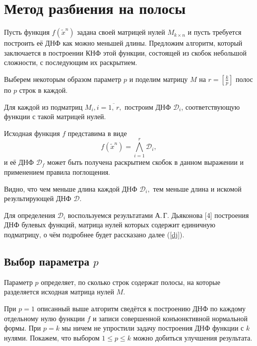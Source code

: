 \documentclass[12pt,a4paper,oneside,fleqn,leqno]{article}
\theoremstyle{definition}
\begin{document}
	\section{Метод разбиения на полосы}
		Пусть функция $f(\tilde x^n)$ задана своей матрицей нулей $M_{k \times n}$ и пусть требуется построить её ДНФ как можно меньшей длины. Предложим алгоритм, который заключается в построении КНФ этой функции, состоящей из скобок небольшой сложности, с последующим их раскрытием.\par
		Выберем некоторым образом параметр $p$ и поделим матрицу $M$ на $r = \left[\frac{k}{p}\right]$ полос по $p$ строк в каждой.\par
		Для каждой из подматриц $M_i, i = \overline{1,\,r},$ построим ДНФ $\mathcal{D}_i$, соответствующую функции с такой матрицей нулей.\par
		Исходная функция $f$ представима в виде
		$$
			f(\tilde x^n) = \bigwedge_{i = 1}^r \mathcal{D}_i,
		$$
		и её ДНФ $\mathcal{D}_f$ может быть получена раскрытием скобок в данном выражении и применением правила поглощения.\par
		Видно, что чем меньше длина каждой ДНФ $\mathcal{D}_i,$ тем меньше длина и искомой результирующей ДНФ $\mathcal{D}.$\par
		Для определения $\mathcal{D}_i$ воспользуемся результатами А.\,Г. Дьяконова [4] построения ДНФ булевых функций, матрица нулей которых содержит единичную подматрицу, о чём подробнее будет рассказано далее (\ref{dj}).
		\subsection{Выбор параметра $p$}
			Параметр $p$ определяет, по сколько строк содержат полосы, на которые разделяется исходная матрица нулей $M.$\par
			При $p = 1$ описанный выше алгоритм сведётся к построению ДНФ по каждому отдельному нулю функции $f$ и записи совершенной конъюнктивной нормальной формы. При $p = k$ мы ничем не упростили задачу построения ДНФ функции с $k$ нулями. Покажем, что выбором $1 \leqslant p \leqslant k$ можно добиться улучшения результата.\par
\end{document}
